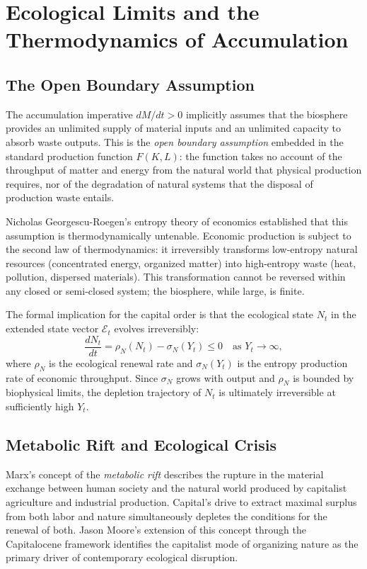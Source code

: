 \documentclass[12pt,a4paper]{article}
\theoremstyle{definition}
\theoremstyle{remark}
\begin{document}
\section{Ecological Limits and the Thermodynamics of Accumulation}
\label{sec:ecology}

\subsection{The Open Boundary Assumption}

The accumulation imperative $dM/dt > 0$ implicitly assumes that the biosphere provides an unlimited supply of material inputs and an unlimited capacity to absorb waste outputs. This is the \emph{open boundary assumption} embedded in the standard production function $F(K, L)$: the function takes no account of the throughput of matter and energy from the natural world that physical production requires, nor of the degradation of natural systems that the disposal of production waste entails.

Nicholas Georgescu-Roegen's entropy theory of economics established that this assumption is thermodynamically untenable. Economic production is subject to the second law of thermodynamics: it irreversibly transforms low-entropy natural resources (concentrated energy, organized matter) into high-entropy waste (heat, pollution, dispersed materials). This transformation cannot be reversed within any closed or semi-closed system; the biosphere, while large, is finite.

The formal implication for the capital order is that the ecological state $N_t$ in the extended state vector $\mathcal{E}_t$ evolves irreversibly:
\begin{equation}
  \label{eq:entropy_production}
  \frac{dN_t}{dt} = \rho_N(N_t) - \sigma_N(Y_t) \leq 0 \quad \text{as } Y_t \to \infty,
\end{equation}
where $\rho_N$ is the ecological renewal rate and $\sigma_N(Y_t)$ is the entropy production rate of economic throughput. Since $\sigma_N$ grows with output and $\rho_N$ is bounded by biophysical limits, the depletion trajectory of $N_t$ is ultimately irreversible at sufficiently high $Y_t$.

\subsection{Metabolic Rift and Ecological Crisis}

Marx's concept of the \emph{metabolic rift} describes the rupture in the material exchange between human society and the natural world produced by capitalist agriculture and industrial production. Capital's drive to extract maximal surplus from both labor and nature simultaneously depletes the conditions for the renewal of both. Jason Moore's extension of this concept through the Capitalocene framework identifies the capitalist mode of organizing nature as the primary driver of contemporary ecological disruption.
\end{document}
